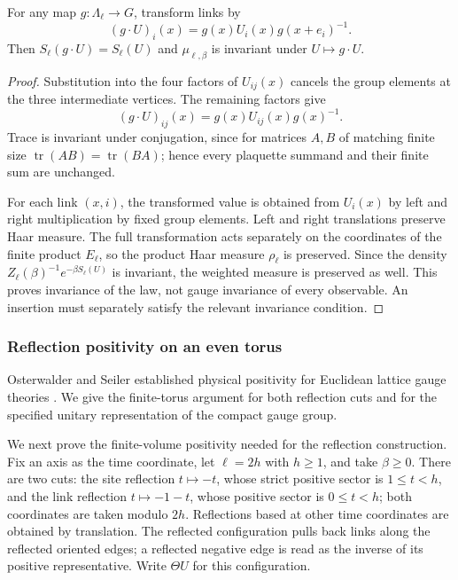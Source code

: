 \begin{proposition}
\label{prop:ex-lattice-gauge}
For any map $g:\Lambda_\ell\to G$, transform links by
\[
 (g\cdot U)_i(x)=g(x)U_i(x)g(x+e_i)^{-1}.
\]
Then $S_\ell(g\cdot U)=S_\ell(U)$ and $\mu_{\ell,\beta}$ is invariant under
$U\mapsto g\cdot U$.
\end{proposition}
\begin{proof}
Substitution into the four factors of $U_{ij}(x)$ cancels the group elements at
the three intermediate vertices. The remaining factors give
\[
 (g\cdot U)_{ij}(x)=g(x)U_{ij}(x)g(x)^{-1}.
\]
Trace is invariant under conjugation, since for matrices $A,B$ of matching
finite size $\operatorname{tr}(AB)=\operatorname{tr}(BA)$; hence every
plaquette summand and their finite sum are unchanged.

For each link $(x,i)$, the transformed value is obtained from $U_i(x)$ by left
and right multiplication by fixed group elements. Left and right translations
preserve Haar measure. The full transformation acts separately on the
coordinates of the finite product $E_\ell$, so the product Haar measure
$\rho_\ell$ is preserved. Since the density $Z_\ell(\beta)^{-1}
e^{-\beta S_\ell(U)}$ is invariant, the weighted measure is preserved as well.
This proves invariance of the law, not gauge invariance of every observable.
An insertion must separately satisfy the relevant invariance condition.
\end{proof}

\subsubsection{Reflection positivity on an even torus}
\label{subsec:ex-lattice-finite-reflection}

Osterwalder and Seiler established physical positivity for Euclidean
lattice gauge theories \cite{OsterwalderSeiler}. We give the finite-torus
argument for both reflection cuts and for the specified unitary
representation of the compact gauge group.


We next prove the finite-volume positivity needed for the reflection
construction. Fix an axis as the time coordinate, let $\ell=2h$ with
$h\geq1$, and take $\beta\geq0$. There are two cuts: the site reflection
$t\mapsto-t$, whose strict positive sector is $1\leq t<h$, and the link
reflection $t\mapsto-1-t$, whose positive sector is $0\leq t<h$; both
coordinates are taken modulo $2h$. Reflections based at other time
coordinates are obtained by translation. The reflected configuration pulls
back links along the reflected oriented edges; a reflected negative edge is
read as the inverse of its positive representative. Write $\Theta U$ for this
configuration.


